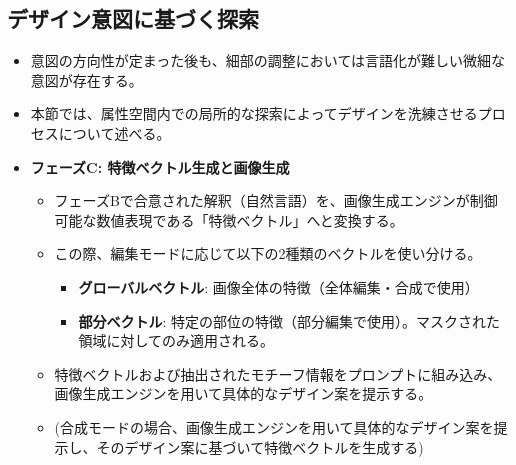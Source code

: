 \documentclass[dvipdfmx]{jlreq}
\begin{document}
\subsection{デザイン意図に基づく探索}
\begin{itemize}
  \item 意図の方向性が定まった後も、細部の調整においては言語化が難しい微細な意図が存在する。
  \item 本節では、属性空間内での局所的な探索によってデザインを洗練させるプロセスについて述べる。
  \item \textbf{フェーズC: 特徴ベクトル生成と画像生成}
  \begin{itemize}
    \item フェーズBで合意された解釈（自然言語）を、画像生成エンジンが制御可能な数値表現である「特徴ベクトル」へと変換する。
    \item この際、編集モードに応じて以下の2種類のベクトルを使い分ける。
    \begin{itemize}
      \item \textbf{グローバルベクトル}: 画像全体の特徴（全体編集・合成で使用）
      \item \textbf{部分ベクトル}: 特定の部位の特徴（部分編集で使用）。マスクされた領域に対してのみ適用される。
    \end{itemize}
    \item 特徴ベクトルおよび抽出されたモチーフ情報をプロンプトに組み込み、画像生成エンジンを用いて具体的なデザイン案を提示する。
    \item (合成モードの場合、画像生成エンジンを用いて具体的なデザイン案を提示し、そのデザイン案に基づいて特徴ベクトルを生成する)
  \end{itemize}


\end{itemize}
\end{document}
